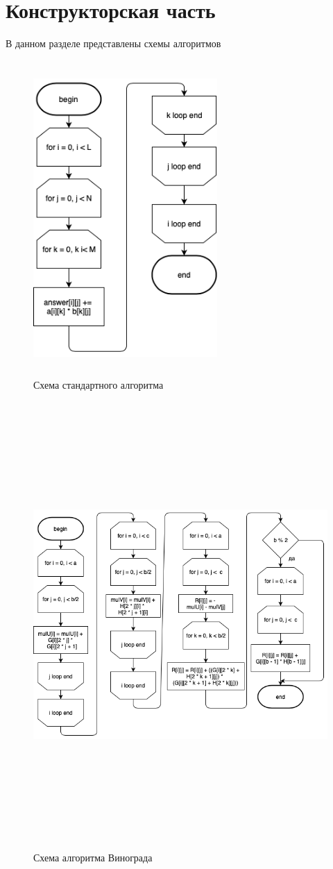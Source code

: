 \documentclass[12pt]{article}
\begin{document}
\section{Конструкторская часть}
В данном разделе представлены схемы алгоритмов 

\begin{figure}[ht!]
	\centering
	\includegraphics[width=70mm, height=120mm]{multiply.png}
	\caption{Схема стандартного алгоритма\label{overflow}}
\end{figure}
\begin{figure}[ht!]
	\centering
	\includegraphics[width=150mm, height=170mm]{wino.png}
	\caption{Схема алгоритма Винограда \label{overflow}}
\end{figure}
\end{document}
